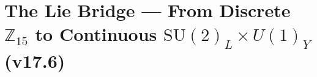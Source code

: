 \documentclass[12pt, a4paper]{article}
\begin{document}
\clearpage

\renewcommand{\tableofcontents}{}


\part{The Lie Bridge --- From Discrete $\mathbb{Z}_{15}$ to Continuous $\mathrm{SU}(2)_L \times U(1)_Y$ (v17.6)}
\label{part:XXIII}
\end{document}
